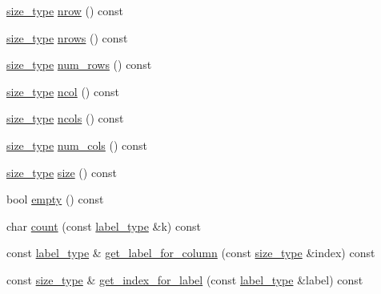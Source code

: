 \begin{DoxyCompactItemize}
\item 
\hyperlink{lib_2IceBRG__main_2common_8h_a566c61f2ca17211f4ba8557f3f65e8d3}{size\+\_\+type} \hyperlink{classIceBRG_1_1labeled__array_a3fcf6732adf2ec5ee51838495832988d}{nrow} () const 
\item 
\hyperlink{lib_2IceBRG__main_2common_8h_a566c61f2ca17211f4ba8557f3f65e8d3}{size\+\_\+type} \hyperlink{classIceBRG_1_1labeled__array_a78df0fe784b16bd7d90abb2ccefd1be2}{nrows} () const 
\item 
\hyperlink{lib_2IceBRG__main_2common_8h_a566c61f2ca17211f4ba8557f3f65e8d3}{size\+\_\+type} \hyperlink{classIceBRG_1_1labeled__array_a2b119ba5aeca24ee05dc7f2a84e2e41a}{num\+\_\+rows} () const 
\item 
\hyperlink{lib_2IceBRG__main_2common_8h_a566c61f2ca17211f4ba8557f3f65e8d3}{size\+\_\+type} \hyperlink{classIceBRG_1_1labeled__array_ae3eac2dbde870c6b454d79b1c1662e55}{ncol} () const 
\item 
\hyperlink{lib_2IceBRG__main_2common_8h_a566c61f2ca17211f4ba8557f3f65e8d3}{size\+\_\+type} \hyperlink{classIceBRG_1_1labeled__array_aebc774531e148fd7d4f4669abdabda5b}{ncols} () const 
\item 
\hyperlink{lib_2IceBRG__main_2common_8h_a566c61f2ca17211f4ba8557f3f65e8d3}{size\+\_\+type} \hyperlink{classIceBRG_1_1labeled__array_aba4f3d74a042e46afe6bf436cafb3a78}{num\+\_\+cols} () const 
\item 
\hyperlink{lib_2IceBRG__main_2common_8h_a566c61f2ca17211f4ba8557f3f65e8d3}{size\+\_\+type} \hyperlink{classIceBRG_1_1labeled__array_af9805f7fba13fe7d4e98ec601b0fd836}{size} () const 
\item 
bool \hyperlink{classIceBRG_1_1labeled__array_a3958e26cbf60cb0a915dc86c9d9eae1f}{empty} () const 
\item 
char \hyperlink{classIceBRG_1_1labeled__array_abc5e780a143def2394b0e160409ebca4}{count} (const \hyperlink{classIceBRG_1_1labeled__array_a6355a8e274be241162cfe4717bcd907f}{label\+\_\+type} \&k) const 
\item 
const \hyperlink{classIceBRG_1_1labeled__array_a6355a8e274be241162cfe4717bcd907f}{label\+\_\+type} \& \hyperlink{classIceBRG_1_1labeled__array_aeed3bc92b4e6e9094b20a29e55eb72d2}{get\+\_\+label\+\_\+for\+\_\+column} (const \hyperlink{lib_2IceBRG__main_2common_8h_a566c61f2ca17211f4ba8557f3f65e8d3}{size\+\_\+type} \&index) const 
\item 
const \hyperlink{lib_2IceBRG__main_2common_8h_a566c61f2ca17211f4ba8557f3f65e8d3}{size\+\_\+type} \& \hyperlink{classIceBRG_1_1labeled__array_a1e199d3f467d9ffbd17f0f579a130d71}{get\+\_\+index\+\_\+for\+\_\+label} (const \hyperlink{classIceBRG_1_1labeled__array_a6355a8e274be241162cfe4717bcd907f}{label\+\_\+type} \&label) const 

\end{DoxyCompactItemize}
